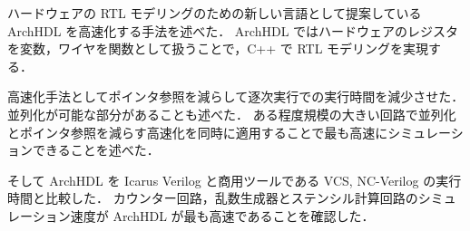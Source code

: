 ハードウェアの RTL モデリングのための新しい言語として提案している ArchHDL を高速化する手法を述べた．
ArchHDL ではハードウェアのレジスタを変数，ワイヤを関数として扱うことで，C++ で RTL モデリングを実現する．

高速化手法としてポインタ参照を減らして逐次実行での実行時間を減少させた．
並列化が可能な部分があることも述べた．
ある程度規模の大きい回路で並列化とポインタ参照を減らす高速化を同時に適用することで最も高速にシミュレーションできることを述べた．

そして ArchHDL を Icarus Verilog と商用ツールである VCS, NC-Verilog の実行時間と比較した．
カウンター回路，乱数生成器とステンシル計算回路のシミュレーション速度が ArchHDL が最も高速であることを確認した．
